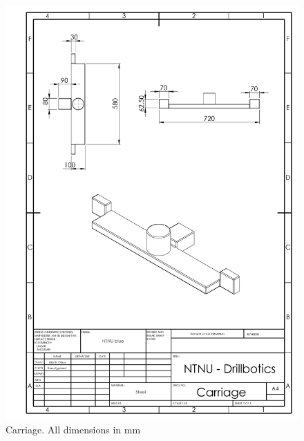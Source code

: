 \newpage
\begin{figure} [H]
\centering
\includegraphics[width=1.0\textwidth]{figures/mechdrawings/Carriage.JPG}
\caption{Carriage. All dimensions in mm} 
\label{fig:Carriage}
\end{figure}

